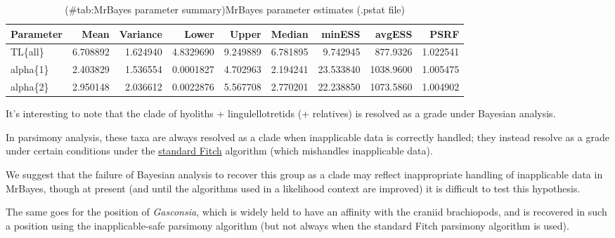 \documentclass[]{book}
\theoremstyle{definition}
\theoremstyle{definition}
\theoremstyle{definition}
\theoremstyle{remark}
\begin{document}
\begin{table}

\caption{(\#tab:MrBayes parameter summary)MrBayes parameter estimates (.pstat file)}
\centering
\begin{tabular}[t]{l|r|r|r|r|r|r|r|r}
\hline
Parameter & Mean & Variance & Lower & Upper & Median & minESS & avgESS & PSRF\\
\hline
TL\{all\} & 6.708892 & 1.624940 & 4.8329690 & 9.249889 & 6.781895 & 9.742945 & 877.9326 & 1.022541\\
\hline
alpha\{1\} & 2.403829 & 1.536554 & 0.0001827 & 4.702963 & 2.194241 & 23.533840 & 1038.9600 & 1.005475\\
\hline
alpha\{2\} & 2.950148 & 2.036612 & 0.0022876 & 5.567708 & 2.770201 & 22.238850 & 1073.5860 & 1.004902\\
\hline
\end{tabular}
\end{table}

It's interesting to note that the clade of hyoliths + lingulellotretids
(+ relatives) is resolved as a grade under Bayesian analysis.

In parsimony analysis, these taxa are always resolved as a clade when
inapplicable data is correctly handled; they instead resolve as a grade
under certain conditions under the \protect\hyperlink{TNT}{standard
Fitch} algorithm (which mishandles inapplicable data).

We suggest that the failure of Bayesian analysis to recover this group
as a clade may reflect inappropriate handling of inapplicable data in
MrBayes, though at present (and until the algorithms used in a
likelihood context are improved) it is difficult to test this
hypothesis.

The same goes for the position of \emph{Gasconsia}, which is widely held
to have an affinity with the craniid brachiopods, and is recovered in
such a position using the inapplicable-safe parsimony algorithm (but not
always when the standard Fitch parsimony algorithm is used).


\end{document}
